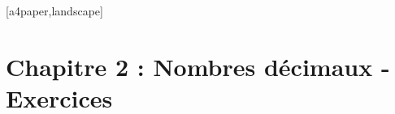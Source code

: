

\newpage
{}[a4paper,landscape]%


\section*{Chapitre 2 : Nombres décimaux - Exercices}






\setcounter{exrcntr}{0}
